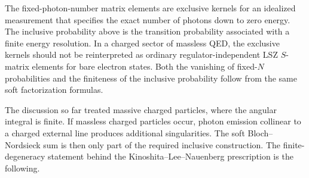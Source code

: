 \begin{remark}
The fixed-photon-number matrix elements are exclusive kernels for an idealized
measurement that specifies the exact number of photons down to zero energy.
The inclusive probability above is the transition probability associated with
a finite energy resolution.  In a charged sector of massless QED, the
exclusive kernels should not be reinterpreted as ordinary regulator-independent
LSZ \(S\)-matrix elements for bare electron states.  Both the vanishing of
fixed-\(N\) probabilities and the finiteness of the inclusive probability
follow from the same soft factorization formulas.
\end{remark}

The discussion so far treated massive charged particles, where the angular
integral is finite.  If massless charged particles occur, photon emission
collinear to a charged external line produces additional singularities.  The
soft Bloch--Nordsieck sum is then only part of the required inclusive
construction.  The finite-degeneracy statement behind the
Kinoshita--Lee--Nauenberg prescription is the following.

